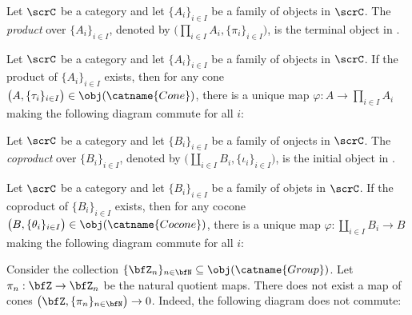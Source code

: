 \begin{definition}
	Let $\scrC$ be a category and let $\{A_i\}_{i \in I}$ be a family of objects in $\scrC$. The \emph{product} over $\{A_i\}_{i \in I}$, denoted by $\bigl( \prod_{i \in I}A_i, \{\pi_i\}_{i \in I} \bigr)$, is the terminal object in . 
\end{definition}

\begin{proposition}
	Let $\scrC$ be a category and let $\{A_i\}_{i \in I}$ be a family of objects in $\scrC$. If the product of $\{A_i\}_{i \in I}$ exists, then for any cone $\bigl( A, \{\tau_i\}_{i \in I} \bigr) \in \obj(\catname{Cone})$, there is a unique map $\varphi:A \rightarrow \prod_{i \in I}A_i$ making the following diagram commute for all $i$:
	\begin{center}
	\end{center}
\end{proposition}

\begin{definition}
	Let $\scrC$ be a category and let $\{B_i\}_{i \in I}$ be a family of onjects in $\scrC$. The \emph{coproduct} over $\{B_i\}_{i \in I}$, denoted by $\bigl( \coprod_{i \in I}B_i, \{\iota_i\}_{i \in I} \bigr)$, is the initial object in .
\end{definition}

\begin{proposition}
	Let $\scrC$ be a category and let $\{B_i\}_{i \in I}$ be a family of objets in $\scrC$. If the coproduct of $\{B_i\}_{i \in I}$ exists, then for any cocone $\bigl( B, \{\theta_i\}_{i \in I} \bigr) \in \obj(\catname{Cocone})$, there is a unique map $\varphi:\coprod_{i \in I} B_i \rightarrow B$ making the following diagram commute for all $i$:
	\begin{center}
	\end{center}
\end{proposition}

\begin{example}
	Consider the collection $\{\bfZ_n\}_{n \in \bfN} \subseteq \obj(\catname{Group})$. Let $\pi_n :\bfZ \rightarrow \bfZ_n$ be the natural quotient maps. There does not exist a map of cones $\bigl( \bfZ , \{\pi_n\}_{n \in \bfN}\bigr)\rightarrow 0$. Indeed, the following diagram does not commute:

\end{example}
